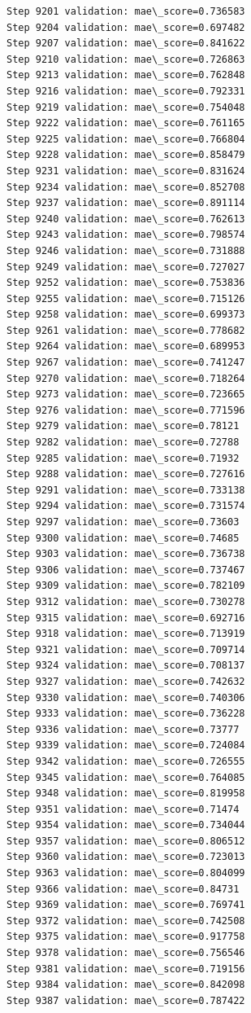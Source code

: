 \documentclass[11pt]{article}
\begin{document}
\begin{Verbatim}[commandchars=\\\{\}]
Step 9201 validation: mae\_score=0.736583
Step 9204 validation: mae\_score=0.697482
Step 9207 validation: mae\_score=0.841622
Step 9210 validation: mae\_score=0.726863
Step 9213 validation: mae\_score=0.762848
Step 9216 validation: mae\_score=0.792331
Step 9219 validation: mae\_score=0.754048
Step 9222 validation: mae\_score=0.761165
Step 9225 validation: mae\_score=0.766804
Step 9228 validation: mae\_score=0.858479
Step 9231 validation: mae\_score=0.831624
Step 9234 validation: mae\_score=0.852708
Step 9237 validation: mae\_score=0.891114
Step 9240 validation: mae\_score=0.762613
Step 9243 validation: mae\_score=0.798574
Step 9246 validation: mae\_score=0.731888
Step 9249 validation: mae\_score=0.727027
Step 9252 validation: mae\_score=0.753836
Step 9255 validation: mae\_score=0.715126
Step 9258 validation: mae\_score=0.699373
Step 9261 validation: mae\_score=0.778682
Step 9264 validation: mae\_score=0.689953
Step 9267 validation: mae\_score=0.741247
Step 9270 validation: mae\_score=0.718264
Step 9273 validation: mae\_score=0.723665
Step 9276 validation: mae\_score=0.771596
Step 9279 validation: mae\_score=0.78121
Step 9282 validation: mae\_score=0.72788
Step 9285 validation: mae\_score=0.71932
Step 9288 validation: mae\_score=0.727616
Step 9291 validation: mae\_score=0.733138
Step 9294 validation: mae\_score=0.731574
Step 9297 validation: mae\_score=0.73603
Step 9300 validation: mae\_score=0.74685
Step 9303 validation: mae\_score=0.736738
Step 9306 validation: mae\_score=0.737467
Step 9309 validation: mae\_score=0.782109
Step 9312 validation: mae\_score=0.730278
Step 9315 validation: mae\_score=0.692716
Step 9318 validation: mae\_score=0.713919
Step 9321 validation: mae\_score=0.709714
Step 9324 validation: mae\_score=0.708137
Step 9327 validation: mae\_score=0.742632
Step 9330 validation: mae\_score=0.740306
Step 9333 validation: mae\_score=0.736228
Step 9336 validation: mae\_score=0.73777
Step 9339 validation: mae\_score=0.724084
Step 9342 validation: mae\_score=0.726555
Step 9345 validation: mae\_score=0.764085
Step 9348 validation: mae\_score=0.819958
Step 9351 validation: mae\_score=0.71474
Step 9354 validation: mae\_score=0.734044
Step 9357 validation: mae\_score=0.806512
Step 9360 validation: mae\_score=0.723013
Step 9363 validation: mae\_score=0.804099
Step 9366 validation: mae\_score=0.84731
Step 9369 validation: mae\_score=0.769741
Step 9372 validation: mae\_score=0.742508
Step 9375 validation: mae\_score=0.917758
Step 9378 validation: mae\_score=0.756546
Step 9381 validation: mae\_score=0.719156
Step 9384 validation: mae\_score=0.842098
Step 9387 validation: mae\_score=0.787422

\end{Verbatim}
\end{document}
